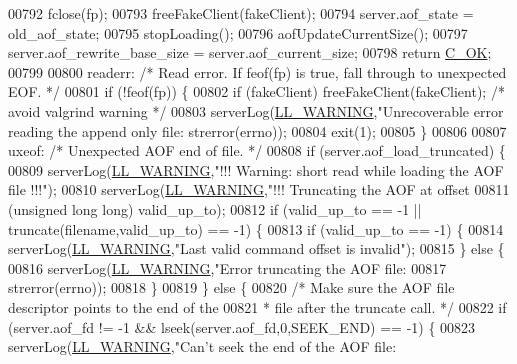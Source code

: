 \begin{DoxyCode}
{{{{{{{{{{{00792     fclose(fp);
00793     freeFakeClient(fakeClient);
00794     server.aof\_state = old\_aof\_state;
00795     stopLoading();
00796     aofUpdateCurrentSize();
00797     server.aof\_rewrite\_base\_size = server.aof\_current\_size;
00798     \textcolor{keywordflow}{return} \hyperlink{server_8h_a303769ef1065076e68731584e758d3e1}{C\_OK};
00799 
00800 readerr: \textcolor{comment}{/* Read error. If feof(fp) is true, fall through to unexpected EOF. */}
00801     \textcolor{keywordflow}{if} (!feof(fp)) \{
00802         \textcolor{keywordflow}{if} (fakeClient) freeFakeClient(fakeClient); \textcolor{comment}{/* avoid valgrind warning */}
00803         serverLog(\hyperlink{server_8h_a31229b9334bba7d6be2a72970967a14b}{LL\_WARNING},\textcolor{stringliteral}{"Unrecoverable error reading the append only file: %
      strerror(errno));
00804         exit(1);
00805     \}
00806 
00807 uxeof: \textcolor{comment}{/* Unexpected AOF end of file. */}
00808     \textcolor{keywordflow}{if} (server.aof\_load\_truncated) \{
00809         serverLog(\hyperlink{server_8h_a31229b9334bba7d6be2a72970967a14b}{LL\_WARNING},\textcolor{stringliteral}{"!!! Warning: short read while loading the AOF file !!!"});
00810         serverLog(\hyperlink{server_8h_a31229b9334bba7d6be2a72970967a14b}{LL\_WARNING},\textcolor{stringliteral}{"!!! Truncating the AOF at offset %
00811             (\textcolor{keywordtype}{unsigned} \textcolor{keywordtype}{long} \textcolor{keywordtype}{long}) valid\_up\_to);
00812         \textcolor{keywordflow}{if} (valid\_up\_to == -1 || truncate(filename,valid\_up\_to) == -1) \{
00813             \textcolor{keywordflow}{if} (valid\_up\_to == -1) \{
00814                 serverLog(\hyperlink{server_8h_a31229b9334bba7d6be2a72970967a14b}{LL\_WARNING},\textcolor{stringliteral}{"Last valid command offset is invalid"});
00815             \} \textcolor{keywordflow}{else} \{
00816                 serverLog(\hyperlink{server_8h_a31229b9334bba7d6be2a72970967a14b}{LL\_WARNING},\textcolor{stringliteral}{"Error truncating the AOF file: %
00817                     strerror(errno));
00818             \}
00819         \} \textcolor{keywordflow}{else} \{
00820             \textcolor{comment}{/* Make sure the AOF file descriptor points to the end of the}
00821 \textcolor{comment}{             * file after the truncate call. */}
00822             \textcolor{keywordflow}{if} (server.aof\_fd != -1 && lseek(server.aof\_fd,0,SEEK\_END) == -1) \{
00823                 serverLog(\hyperlink{server_8h_a31229b9334bba7d6be2a72970967a14b}{LL\_WARNING},\textcolor{stringliteral}{"Can't seek the end of the AOF file: %
}}}}}}}}}}}}}}}
\end{DoxyCode}
